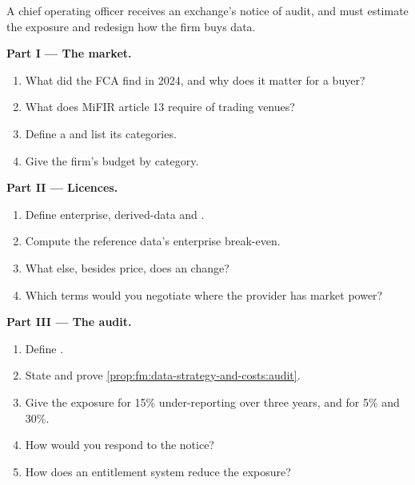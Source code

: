 \begin{problem}\label{pb:fm:data-strategy-and-costs:1}
A chief operating officer receives an exchange's notice of audit, and must estimate the exposure and redesign how the firm buys data.

\medskip\noindent\textbf{Part I --- The market.}
\begin{enumerate}
\item What did the FCA find in 2024, and why does it matter for a buyer?
\item What does MiFIR article 13 require of trading venues?
\item Define a  and list its categories.
\item Give the firm's budget by category.
\end{enumerate}

\medskip\noindent\textbf{Part II --- Licences.}
\begin{enumerate}[resume]
\item Define enterprise, derived-data and .
\item Compute the reference data's enterprise break-even.
\item What else, besides price, does an  change?
\item Which terms would you negotiate where the provider has market power?
\end{enumerate}

\medskip\noindent\textbf{Part III --- The audit.}
\begin{enumerate}[resume]
\item Define .
\item State and prove \cref{prop:fm:data-strategy-and-costs:audit}.
\item Give the exposure for 15\% under-reporting over three years, and for 5\% and 30\%.
\item How would you respond to the notice?
\item How does an entitlement system reduce the exposure?
\end{enumerate}


\end{problem}
